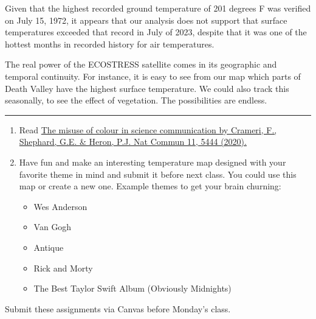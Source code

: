\documentclass[oneside,a4paper,11pt,explicit]{book}
\begin{document}
Given that the highest recorded ground temperature of 201 degrees F was verified on July 15, 1972, it appears that our analysis does not support that surface temperatures exceeded that record in July of 2023, despite that it was one of the hottest months in recorded history for air temperatures.


The real power of the ECOSTRESS satellite comes in its geographic and temporal continuity. For instance, it is easy to see from our map which parts of Death Valley have the highest surface temperature. We could also track this seasonally, to see the effect of vegetation. The possibilities are endless.

\vspace{.25em}

\hrule

\vspace{1 em}

\begin{tcolorbox}[colback=yellow!5!white,colframe=red!85!blue,title= \vspace{.2em} \Large Map of the Week Assignments]
	\large
	\begin{enumerate}
		\item Read \href{https://jeremydforsythe.github.io/icecream-tutorials/Tutorial4_AddingElementsToMaps/s41467-020-19160-7.pdf}{The misuse of colour in science communication by Crameri, F., Shephard, G.E. \& Heron, P.J.  Nat Commun 11, 5444 (2020).}
		\item Have fun and make an interesting temperature map designed with your favorite theme in mind and submit it before next class. You could use this map or create a new one. Example themes to get your brain churning:
		\begin{itemize}
			\item Wes Anderson
			\item Van Gogh
			\item Antique
			\item Rick and Morty
			\item The Best Taylor Swift Album (Obviously Midnights)
		\end{itemize}
	\end{enumerate}
	Submit these assignments via Canvas before Monday's class.
\end{tcolorbox}
\end{document}
